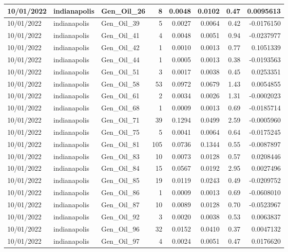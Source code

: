 \documentclass[
  letterpaper,
  DIV=11,
  numbers=noendperiod]{scrartcl}
\begin{document}
\begin{tabular}{l|l|l|r|r|r|r|r}
\hline
10/01/2022 & indianapolis & Gen\_Oil\_26 & 8 & 0.0048 & 0.0102 & 0.47 & 0.0095613\\
\hline
10/01/2022 & indianapolis & Gen\_Oil\_39 & 5 & 0.0027 & 0.0064 & 0.42 & -0.0176150\\
\hline
10/01/2022 & indianapolis & Gen\_Oil\_41 & 4 & 0.0048 & 0.0051 & 0.94 & -0.0237977\\
\hline
10/01/2022 & indianapolis & Gen\_Oil\_42 & 1 & 0.0010 & 0.0013 & 0.77 & 0.1051339\\
\hline
10/01/2022 & indianapolis & Gen\_Oil\_44 & 1 & 0.0005 & 0.0013 & 0.38 & -0.0193563\\
\hline
10/01/2022 & indianapolis & Gen\_Oil\_51 & 3 & 0.0017 & 0.0038 & 0.45 & 0.0253351\\
\hline
10/01/2022 & indianapolis & Gen\_Oil\_58 & 53 & 0.0972 & 0.0679 & 1.43 & 0.0054855\\
\hline
10/01/2022 & indianapolis & Gen\_Oil\_61 & 2 & 0.0034 & 0.0026 & 1.31 & -0.0002023\\
\hline
10/01/2022 & indianapolis & Gen\_Oil\_68 & 1 & 0.0009 & 0.0013 & 0.69 & -0.0185714\\
\hline
10/01/2022 & indianapolis & Gen\_Oil\_71 & 39 & 0.1294 & 0.0499 & 2.59 & -0.0005960\\
\hline
10/01/2022 & indianapolis & Gen\_Oil\_75 & 5 & 0.0041 & 0.0064 & 0.64 & -0.0175245\\
\hline
10/01/2022 & indianapolis & Gen\_Oil\_81 & 105 & 0.0736 & 0.1344 & 0.55 & -0.0087897\\
\hline
10/01/2022 & indianapolis & Gen\_Oil\_83 & 10 & 0.0073 & 0.0128 & 0.57 & 0.0208446\\
\hline
10/01/2022 & indianapolis & Gen\_Oil\_84 & 15 & 0.0567 & 0.0192 & 2.95 & 0.0027496\\
\hline
10/01/2022 & indianapolis & Gen\_Oil\_85 & 19 & 0.0119 & 0.0243 & 0.49 & -0.0209752\\
\hline
10/01/2022 & indianapolis & Gen\_Oil\_86 & 1 & 0.0009 & 0.0013 & 0.69 & -0.0608010\\
\hline
10/01/2022 & indianapolis & Gen\_Oil\_87 & 10 & 0.0089 & 0.0128 & 0.70 & -0.0523967\\
\hline
10/01/2022 & indianapolis & Gen\_Oil\_92 & 3 & 0.0020 & 0.0038 & 0.53 & 0.0063837\\
\hline
10/01/2022 & indianapolis & Gen\_Oil\_96 & 32 & 0.0152 & 0.0410 & 0.37 & 0.0047132\\
\hline
10/01/2022 & indianapolis & Gen\_Oil\_97 & 4 & 0.0024 & 0.0051 & 0.47 & 0.0176620\\

\end{tabular}
\end{document}
